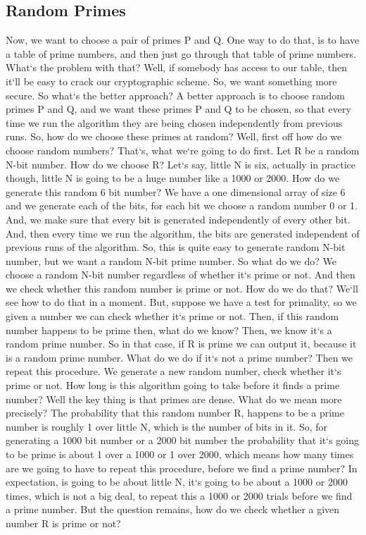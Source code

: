 \subsection{Random Primes}
Now, we want to choose a pair of primes P and Q\@.
One way to do that, is to have a table of prime numbers, and then just go through that table of prime numbers.
What`s the problem with that? Well, if somebody has access to our table, then it`ll be easy to crack our cryptographic scheme.
So, we want something more secure.
So what`s the better approach? A better approach is to choose random primes P and Q, and we want these primes P and Q to be chosen, so that every time we run the algorithm they are being chosen independently from previous runs.
So, how do we choose these primes at random? Well, first off how do we choose random numbers? That`s, what we`re going to do first.
Let R be a random N-bit number.
How do we choose R? Let`s say, little N is six, actually in practice though, little N is going to be a huge number like a 1000 or 2000.
How do we generate this random 6 bit number? We have a one dimensional array of size 6 and we generate each of the bits, for each bit we choose a random number 0 or 1.
And, we make sure that every bit is generated independently of every other bit.
And, then every time we run the algorithm, the bits are generated independent of previous runs of the algorithm.
So, this is quite easy to generate random N-bit number, but we want a random N-bit prime number.
So what do we do? We choose a random N-bit number regardless of whether it`s prime or not.
And then we check whether this random number is prime or not.
How do we do that? We`ll see how to do that in a moment.
But, suppose we have a test for primality, so we given a number we can check whether it`s prime or not.
Then, if this random number happens to be prime then, what do we know? Then, we know it`s a random prime number.
So in that case, if R is prime we can output it, because it is a random prime number.
What do we do if it`s not a prime number? Then we repeat this procedure.
We generate a new random number, check whether it`s prime or not.
How long is this algorithm going to take before it finds a prime number? Well the key thing is that primes are dense.
What do we mean more precisely? The probability that this random number R, happens to be a prime number is roughly 1 over little N, which is the number of bits in it.
So, for generating a 1000 bit number or a 2000 bit number the probability that it`s going to be prime is about 1 over a 1000 or 1 over 2000, which means how many times are we going to have to repeat this procedure, before we find a prime number? In expectation, is going to be about little N, it`s going to be about a 1000 or 2000 times, which is not a big deal, to repeat this a 1000 or 2000 trials before we find a prime number.
But the question remains, how do we check whether a given number R is prime or not?

